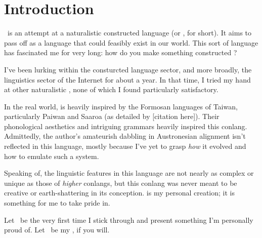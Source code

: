 \chapter{Introduction}
\langname~is an attempt at a naturalistic constructed language (or , for short).
It aims to pass off as a language that could feasibly exist in our world. This sort of
language has fascinated me for very long: how do you make something constructed ?

I've been lurking within the consturcted language sector, and more broadly, the linguistics
sector of the Internet for about a year. In that time, I tried my hand at other naturalistic ,
none of which I found particularly satisfactory.

In the real world, \langname{} is heavily inspired by the Formosan languages of Taiwan,
particularly Paiwan \cite{chang_paiwan} and Saaroa (as detailed by [citation here]).
Their phonological aesthetics and intriguing grammars heavily inspired this conlang.
Admittedly, the author's amateurish dabbling in Austronesian alignment isn't reflected in this language,
mostly because I've yet to grasp \textit{how} it evolved and how to emulate such a system.

Speaking of, the linguistic features in this language are not nearly as
complex or unique as those of \textit{higher} conlangs, but this conlang
was never meant to be creative or earth-shattering in its conception. \langname{}
is my personal creation; it is something for me to take pride in.

Let \langname~be the very first time I stick through and present something I'm personally proud of.
Let \langname~be my , if you will.
